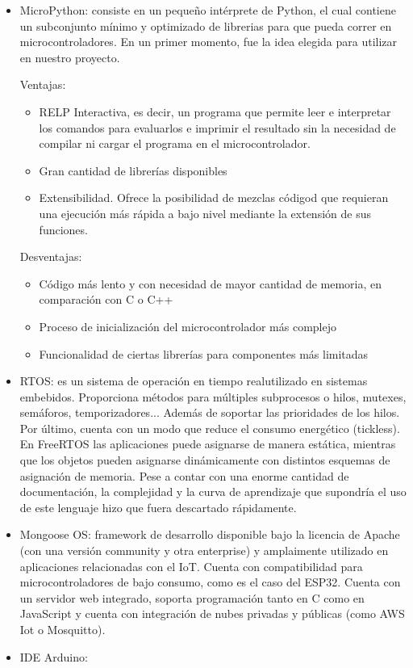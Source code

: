 \documentclass[runningheads]{llncs}
\begin{document}
\begin{itemize}
    \item MicroPython: consiste en un pequeño intérprete de Python, el cual contiene un subconjunto mínimo y optimizado de librerias para que pueda correr en microcontroladores.
    En un primer momento, fue la idea elegida para utilizar en nuestro proyecto.
    
    Ventajas:
    \begin{itemize}
        \item RELP Interactiva, es decir, un programa que permite leer e interpretar los comandos para evaluarlos e imprimir el resultado sin la necesidad de compilar ni cargar el programa en el microcontrolador.
        \item Gran cantidad de librerías disponibles
        \item Extensibilidad. Ofrece la posibilidad de mezclas códigod que requieran una ejecución más rápida a bajo nivel mediante la extensión de sus funciones.
    \end{itemize}
    
    Desventajas:
    \begin{itemize}
        \item Código más lento y con necesidad de mayor cantidad de memoria, en comparación con C o C++
        \item Proceso de inicialización del microcontrolador más complejo
        \item Funcionalidad de ciertas librerías para componentes más limitadas
    \end{itemize}
     
    \item RTOS: es un sistema de operación en tiempo realutilizado en sistemas embebidos. Proporciona métodos para múltiples subprocesos o hilos, mutexes, semáforos, temporizadores... Además de soportar las prioridades de los hilos. Por último, cuenta con un modo que reduce el consumo energético (tickless). En FreeRTOS las aplicaciones puede asignarse de manera estática, mientras que los objetos pueden asignarse dinámicamente con distintos esquemas de asignación de memoria. 
    Pese a contar con una enorme cantidad de documentación, la complejidad y la curva de aprendizaje que supondría el uso de este lenguaje hizo que fuera descartado rápidamente.
    
    \item Mongoose OS: framework de desarrollo disponible bajo la licencia de Apache (con una versión community y otra enterprise) y amplaimente utilizado en aplicaciones relacionadas con el IoT. Cuenta con compatibilidad para microcontroladores de bajo consumo, como es el caso del ESP32. Cuenta con un servidor web integrado, soporta programación tanto en C como en JavaScript y cuenta con integración de nubes privadas y públicas (como AWS Iot o Mosquitto).
    
    \item IDE Arduino:
    
    
\end{itemize}
\end{document}
